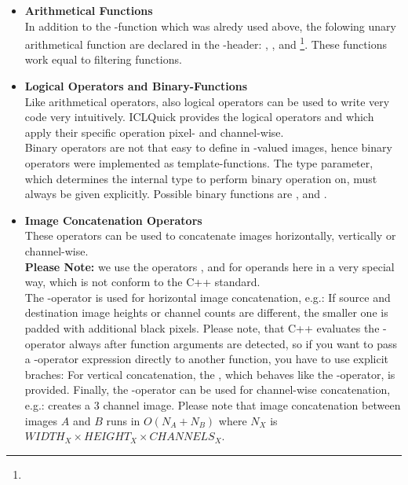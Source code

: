 \begin{itemize}
\item \textbf{Arithmetical Functions}\\
In addition to the -function which was alredy used above, the folowing unary arithmetical function are declared in the -header: , ,  and \footnote{}. These functions work equal to filtering functions.

\item \textbf{Logical Operators and Binary-Functions}\\
Like arithmetical operators, also logical operators can be used to write very code very intuitively. ICLQuick provides the logical operators \icode{||} and \icode{&&} which apply their specific operation pixel- and channel-wise. \\
Binary operators are not that easy to define in -valued images, hence binary operators were implemented as template-functions. The type parameter, which determines the internal type to perform binary operation on, must always be given explicitly. Possible binary functions are ,  and .  

\item \textbf{Image Concatenation Operators}\\
These operators can be used to concatenate images horizontally, vertically or channel-wise.\\[10pt]
\textbf{Please Note:} we use the operators \icode{|}, \icode{,} and \icode{\%} for  operands here in a very special way, which is not conform to the C++ standard.\\[10pt]
The \icode{,}-operator is used for horizontal image concatenation, e.g.:
If source and destination image heights or channel counts are different, the smaller one is padded with additional black pixels. Please note, that C++ evaluates the \icode{,}-operator always after function arguments are detected, so if you want to pass a \icode{,}-operator expression directly to another function, you have to use explicit braches:
For vertical concatenation, the \icode{\%}, which behaves like the \icode{,}-operator, is provided.
Finally, the \icode{|}-operator can be used for channel-wise concatenation, e.g.:
creates a 3 channel image. Please note that image concatenation between images $A$ and $B$ runs in $O(N_A+N_B)$ where $N_X$ is $WIDTH_X \times{}HEIGHT_X \times{} CHANNELS_X$.


\end{itemize}
